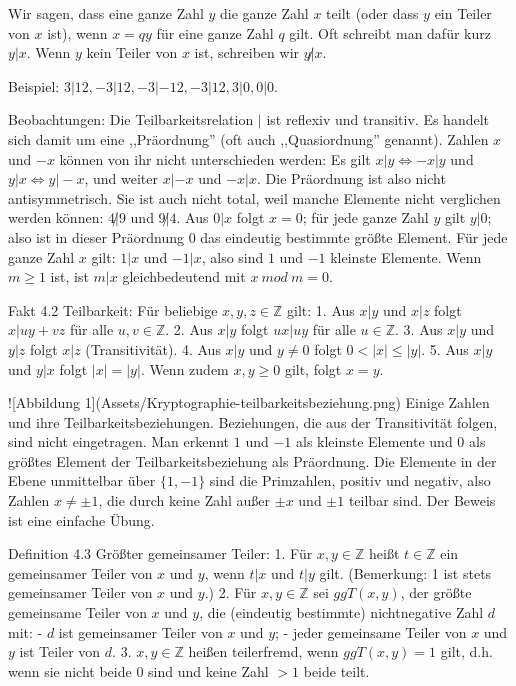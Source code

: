 \documentclass[a4paper]{article}
\begin{document}
\begin{multicols}{3}
    Wir sagen, dass eine ganze Zahl $y$ die ganze Zahl $x$ teilt (oder dass $y$ ein Teiler von $x$ ist), wenn $x=qy$ für eine ganze Zahl $q$ gilt. Oft schreibt man dafür kurz $y|x$. Wenn $y$ kein Teiler von $x$ ist, schreiben wir $y\not|x$.

    Beispiel: $3|12,-3|12,-3|-12,-3|12,3|0,0|0$.

    Beobachtungen: Die Teilbarkeitsrelation $|$ ist reflexiv und transitiv. Es handelt sich damit um eine ,,Präordnung'' (oft auch ,,Quasiordnung'' genannt). Zahlen $x$ und $-x$ können von ihr nicht unterschieden werden: Es gilt $x|y\Leftrightarrow -x|y$ und $y|x\Leftrightarrow y|-x$, und weiter $x|-x$ und $-x|x$. Die Präordnung ist also nicht antisymmetrisch. Sie ist auch nicht total, weil manche Elemente nicht verglichen werden können: $4\not|9$ und $9\not|4$. Aus $0|x$ folgt $x=0$; für jede ganze Zahl $y$ gilt $y|0$; also ist in dieser Präordnung $0$ das eindeutig bestimmte größte Element. Für jede ganze Zahl $x$ gilt: $1|x$ und $-1|x$, also sind $1$ und $-1$ kleinste Elemente. Wenn $m\geq 1$ ist, ist $m|x$ gleichbedeutend mit $x\ mod\ m= 0$.

    Fakt 4.2 Teilbarkeit: Für beliebige $x,y,z\in\mathbb{Z}$ gilt:
    1. Aus $x|y$ und $x|z$ folgt $x|uy+vz$ für alle $u,v\in\mathbb{Z}$.
    2. Aus $x|y$ folgt $ux|uy$ für alle $u\in\mathbb{Z}$.
    3. Aus $x|y$ und $y|z$ folgt $x|z$ (Transitivität).
    4. Aus $x|y$ und $y\not= 0$ folgt $0<|x|\leq |y|$.
    5. Aus $x|y$ und $y|x$ folgt $|x|=|y|$. Wenn zudem $x,y\geq 0$ gilt, folgt $x=y$.

    ![Abbildung 1](Assets/Kryptographie-teilbarkeitsbeziehung.png)
    Einige Zahlen und ihre Teilbarkeitsbeziehungen. Beziehungen, die aus der Transitivität folgen, sind nicht eingetragen. Man erkennt $1$ und $-1$ als kleinste Elemente und $0$ als größtes Element der Teilbarkeitsbeziehung als Präordnung. Die Elemente in der Ebene unmittelbar über $\{1,-1\}$ sind die Primzahlen, positiv und negativ, also Zahlen $x\not=\pm 1$, die durch keine Zahl außer $\pm x$ und $\pm 1$ teilbar sind.
    Der Beweis ist eine einfache Übung.

    Definition 4.3 Größter gemeinsamer Teiler:
    1. Für $x,y\in\mathbb{Z}$ heißt $t\in\mathbb{Z}$ ein gemeinsamer Teiler von $x$ und $y$, wenn $t|x$ und $t|y$ gilt. (Bemerkung: 1 ist stets gemeinsamer Teiler von $x$ und $y$.)
    2. Für $x,y\in\mathbb{Z}$ sei $ggT(x, y)$, der größte gemeinsame Teiler von $x$ und $y$, die (eindeutig bestimmte) nichtnegative Zahl $d$ mit:
    - $d$ ist gemeinsamer Teiler von $x$ und $y$;
    - jeder gemeinsame Teiler von $x$ und $y$ ist Teiler von $d$.
    3. $x,y\in\mathbb{Z}$ heißen teilerfremd, wenn $ggT(x,y)=1$ gilt, d.h. wenn sie nicht beide $0$ sind und keine Zahl $>1$ beide teilt.


\end{multicols}
\end{document}
